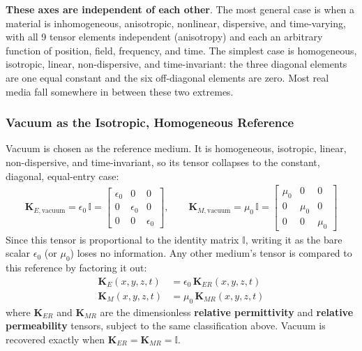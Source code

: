 \textbf{These axes are independent of each other}. The most general case is when a material
is inhomogeneous, anisotropic, nonlinear, dispersive, and time-varying, with all 9
tensor elements independent (anisotropy) and each an arbitrary function of position,
field, frequency, and time. The simplest case is homogeneous, isotropic, linear,
non-dispersive, and time-invariant: the three diagonal elements are one equal
constant and the six off-diagonal elements are zero.
Most real media fall somewhere in between these two extremes.

\subsubsection{Vacuum as the Isotropic, Homogeneous Reference}

Vacuum is chosen as the reference medium. It is homogeneous, isotropic,
linear, non-dispersive, and time-invariant, so its tensor collapses
to the constant, diagonal, equal-entry case:
\begin{align*}
  \mathbf{K}_{E,\text{vacuum}} = \epsilon_0 \, \mathbb{I} = \begin{bmatrix}
    \epsilon_0 & 0 & 0 \\ 0 & \epsilon_0 & 0 \\ 0 & 0 & \epsilon_0
  \end{bmatrix}, \qquad
  \mathbf{K}_{M,\text{vacuum}} = \mu_0 \, \mathbb{I} = \begin{bmatrix}
    \mu_0 & 0 & 0 \\ 0 & \mu_0 & 0 \\ 0 & 0 & \mu_0
  \end{bmatrix}
\end{align*}
Since this tensor is proportional to the identity matrix \( \mathbb{I} \),
writing it as the bare scalar \( \epsilon_0 \) (or \( \mu_0 \)) loses no
information. Any other medium's tensor is compared to this reference by
factoring it out:
\begin{align*}
  \mathbf{K}_E(x,y,z,t) &= \epsilon_0 \, \mathbf{K}_{ER}(x,y,z,t) \\
  \mathbf{K}_M(x,y,z,t) &= \mu_0 \, \mathbf{K}_{MR}(x,y,z,t)
\end{align*}
where \( \mathbf{K}_{ER} \) and \( \mathbf{K}_{MR} \) are the
dimensionless \textbf{relative permittivity} and \textbf{relative
permeability} tensors, subject to the same classification above. Vacuum is
recovered exactly when \( \mathbf{K}_{ER} = \mathbf{K}_{MR} =
\mathbb{I} \).

